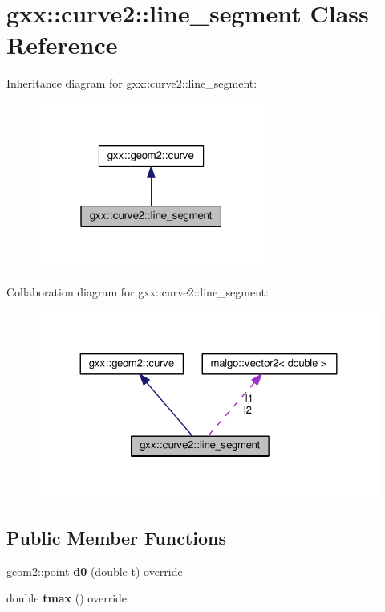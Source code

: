 \hypertarget{classgxx_1_1curve2_1_1line__segment}{}\section{gxx\+:\+:curve2\+:\+:line\+\_\+segment Class Reference}
\label{classgxx_1_1curve2_1_1line__segment}


Inheritance diagram for gxx\+:\+:curve2\+:\+:line\+\_\+segment\+:
\nopagebreak
\begin{figure}[H]
\begin{center}
\leavevmode
\includegraphics[width=211pt]{classgxx_1_1curve2_1_1line__segment__inherit__graph}
\end{center}
\end{figure}


Collaboration diagram for gxx\+:\+:curve2\+:\+:line\+\_\+segment\+:
\nopagebreak
\begin{figure}[H]
\begin{center}
\leavevmode
\includegraphics[width=324pt]{classgxx_1_1curve2_1_1line__segment__coll__graph}
\end{center}
\end{figure}
\subsection*{Public Member Functions}
\begin{DoxyCompactItemize}
\item 
\hyperlink{classmalgo_1_1vector2}{geom2\+::point} {\bfseries d0} (double t) override\hypertarget{classgxx_1_1curve2_1_1line__segment_af7139d8045f65d76ebc09d1f637ad1cf}{}\label{classgxx_1_1curve2_1_1line__segment_af7139d8045f65d76ebc09d1f637ad1cf}

\item 
double {\bfseries tmax} () override\hypertarget{classgxx_1_1curve2_1_1line__segment_a45b221625a3363f53f7682017167ce89}{}\label{classgxx_1_1curve2_1_1line__segment_a45b221625a3363f53f7682017167ce89}

\end{DoxyCompactItemize}
